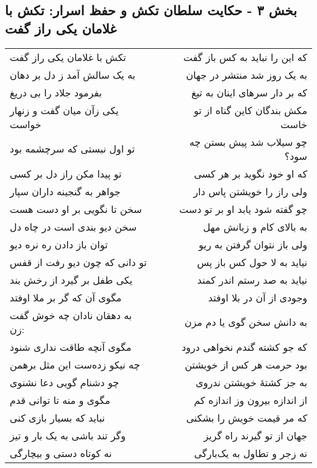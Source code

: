\begin{center}
\section*{بخش ۳ - حکایت سلطان تکش و حفظ اسرار: تکش با غلامان یکی راز گفت}
\label{sec:003}
\begin{longtable}{l p{0.5cm} r}
تکش با غلامان یکی راز گفت
&&
که این را نباید به کس باز گفت
\\
به یک سالش آمد ز دل بر دهان
&&
به یک روز شد منتشر در جهان
\\
بفرمود جلاد را بی دریغ
&&
که بر دار سرهای اینان به تیغ
\\
یکی زآن میان گفت و زنهار خواست
&&
مکش بندگان کاین گناه از تو خاست
\\
تو اول نبستی که سرچشمه بود
&&
چو سیلاب شد پیش بستن چه سود؟
\\
تو پیدا مکن راز دل بر کسی
&&
که او خود نگوید بر هر کسی
\\
جواهر به گنجینه داران سپار
&&
ولی راز را خویشتن پاس دار
\\
سخن تا نگویی بر او دست هست
&&
چو گفته شود یابد او بر تو دست
\\
سخن دیو بندی است در چاه دل
&&
به بالای کام و زبانش مهل
\\
توان باز دادن ره نره دیو
&&
ولی باز نتوان گرفتن به ریو
\\
تو دانی که چون دیو رفت از قفس
&&
نیاید به لا حول کس باز پس
\\
یکی طفل بر گیرد از رخش بند
&&
نیاید به صد رستم اندر کمند
\\
مگوی آن که گر بر ملا اوفتد
&&
وجودی از آن در بلا اوفتد
\\
به دهقان نادان چه خوش گفت زن:
&&
به دانش سخن گوی یا دم مزن
\\
مگوی آنچه طاقت نداری شنود
&&
که جو کشته گندم نخواهی درود
\\
چه نیکو زده‌ست این مثل برهمن
&&
بود حرمت هر کس از خویشتن
\\
چو دشنام گویی دعا نشنوی
&&
به جز کشتهٔ خویشتن ندروی
\\
مگوی و منه تا توانی قدم
&&
از اندازه بیرون وز اندازه کم
\\
نباید که بسیار بازی کنی
&&
که مر قیمت خویش را بشکنی
\\
وگر تند باشی به یک بار و تیز
&&
جهان از تو گیرند راه گریز
\\
نه کوتاه دستی و بیچارگی
&&
نه زجر و تطاول به یک‌بارگی
\\
\end{longtable}
\end{center}
